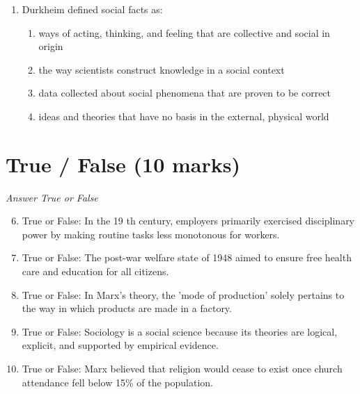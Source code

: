 \documentclass[12pt]{article}
\begin{document}
\begin{enumerate}[label=\arabic*.]
\begin{enumerate}[label=(\alph*)]
    \item highly specialized, interrelated sets of social practices
    \item disorganized social relations in a postmodern world
    \item virtual communities in cyberspace
    \item no longer relevant to sociology
\end{enumerate}
\item Durkheim defined social facts as:
\begin{enumerate}[label=(\alph*)]
    \item ways of acting, thinking, and feeling that are collective and social in origin
    \item the way scientists construct knowledge in a social context
    \item data collected about social phenomena that are proven to be correct
    \item ideas and theories that have no basis in the external, physical world
\end{enumerate}
\end{enumerate}

\section*{True / False (10 marks)}
\textit{Answer True or False}
\begin{enumerate}[label=\arabic*.]
\setcounter{enumi}{5}
\item True or False: In the 19 th century, employers primarily exercised disciplinary power by making routine tasks less monotonous for workers.
\item True or False: The post-war welfare state of 1948 aimed to ensure free health care and education for all citizens.
\item True or False: In Marx's theory, the 'mode of production' solely pertains to the way in which products are made in a factory.
\item True or False: Sociology is a social science because its theories are logical, explicit, and supported by empirical evidence.
\item True or False: Marx believed that religion would cease to exist once church attendance fell below 15\% of the population.
\end{enumerate}
\end{document}
